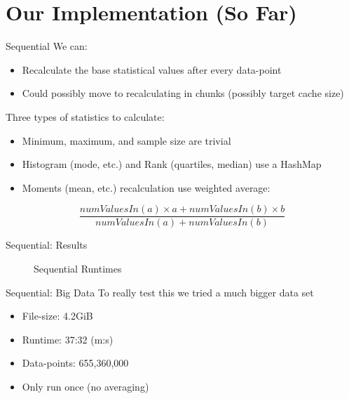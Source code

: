 \documentclass[10pt,aspectratio=169]{beamer} %
\begin{document}

\section{Our Implementation (So Far)}

\begin{frame}{Sequential}
We can:
\begin{itemize}
\item Recalculate the base statistical values after every data-point
\item Could possibly move to recalculating in chunks (possibly target cache size)
\end{itemize}
Three types of statistics to calculate:
\begin{itemize}
\item Minimum, maximum, and sample size are trivial
\item Histogram (mode, etc.) and Rank (quartiles, median) use a HashMap
\item Moments (mean, etc.) recalculation use weighted average:
\end{itemize}
$$\frac{numValuesIn(a)\times a+numValuesIn(b)\times b}{numValuesIn(a) + numValuesIn(b)}$$
\end{frame}

\begin{frame}{Sequential: Results}
\begin{figure}
{
\setlength{\fboxsep}{1pt}%
\setlength{\fboxrule}{1pt}%
%
}%
\caption{Sequential Runtimes}
\end{figure}
\end{frame}

\begin{frame}{Sequential: Big Data}
To really test this we tried a much bigger data set
\begin{itemize}
	\item File-size: 4.2GiB
    \item Runtime: 37:32 (m:s)
    \item Data-points: 655,360,000
    \item Only run once (no averaging)
\end{itemize}
\end{frame}
\end{document}
